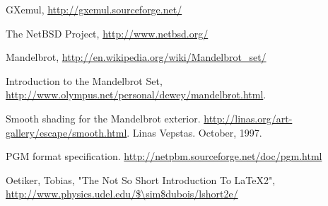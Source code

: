 \documentclass[a4paper,10pt]{article}
\begin{document}
\pagebreak

\begin{thebibliography}{99}
	
 GXemul, \url{http://gxemul.sourceforge.net/}

 The NetBSD Project, \url{http://www.netbsd.org/}

 Mandelbrot, \url{http://en.wikipedia.org/wiki/Mandelbrot\_set/}

  Introduction to the Mandelbrot Set,
\url{http://www.olympus.net/personal/dewey/mandelbrot.html}.

 Smooth shading for the Mandelbrot exterior.
\url{http://linas.org/art-gallery/escape/smooth.html}. Linas Vepstas. October, 1997.

 PGM format specification.
\url{http://netpbm.sourceforge.net/doc/pgm.html}

 Oetiker, Tobias, "The Not So Short Introduction To LaTeX2", \url{http://www.physics.udel.edu/$\sim$dubois/lshort2e/}

\end{thebibliography}
\end{document}
